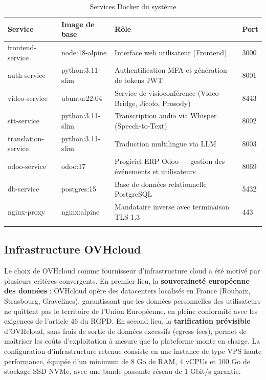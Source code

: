 \begin{longtable}{|m{3.5cm}|m{3.5cm}|m{4.5cm}|m{1cm}|}
\hline
\textbf{Service} & \textbf{Image de base} & \textbf{Rôle} & \textbf{Port} \\
\hline
\endhead
\endfoot
\endlastfoot
\hline
frontend-service & node:18-alpine & Interface web utilisateur (Frontend) & 3000 \\
\hline
auth-service & python:3.11-slim & Authentification MFA et génération de tokens JWT & 8001 \\
\hline
video-service & ubuntu:22.04 & Service de visioconférence (Video Bridge, Jicofo, Prosody) & 8443 \\
\hline
stt-service & python:3.11-slim & Transcription audio via Whisper (Speech-to-Text) & 8002 \\
\hline
translation-service & python:3.11-slim & Traduction multilingue via LLM & 8003 \\
\hline
odoo-service & odoo:17 & Progiciel ERP Odoo — gestion des événements et utilisateurs & 8069 \\
\hline
db-service & postgres:15 & Base de données relationnelle PostgreSQL & 5432 \\
\hline
nginx-proxy & nginx:alpine & Mandataire inverse avec terminaison TLS 1.3 & 443 \\
\hline
\captionsetup{justification=centering,margin=2cm}
\caption{Services Docker du système}
\label{tab:docker}
\end{longtable}

\subsection{Infrastructure OVHcloud}
Le choix de OVHcloud comme fournisseur d'infrastructure cloud a été motivé par plusieurs critères convergents. En premier lieu, la \textbf{souveraineté européenne des données} : OVHcloud opère des datacenters localisés en France (Roubaix, Strasbourg, Gravelines), garantissant que les données personnelles des utilisateurs ne quittent pas le territoire de l'Union Européenne, en pleine conformité avec les exigences de l'article 46 du RGPD. En second lieu, la \textbf{tarification prévisible} d'OVHcloud, sans frais de sortie de données excessifs (egress fees), permet de maîtriser les coûts d'exploitation à mesure que la plateforme monte en charge. La configuration d'infrastructure retenue consiste en une instance de type VPS haute performance, équipée d'un minimum de 8 Go de RAM, 4 vCPUs et 100 Go de stockage SSD NVMe, avec une bande passante réseau de 1 Gbit/s garantie.

